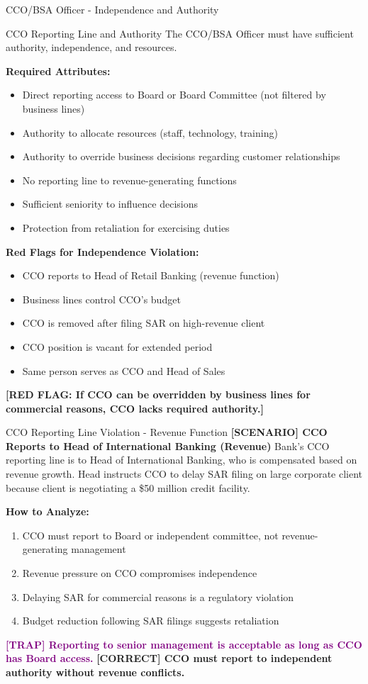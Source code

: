 \documentclass[11pt,a4paper]{beamer}
\newcommand{\trap}[1]{\textcolor{purple}{\textbf{[TRAP] #1}}}
\newcommand{\correct}[1]{\textcolor{green!50!black}{\textbf{[CORRECT] #1}}}
\newcommand{\scenario}[1]{\textcolor{blue!70!black}{\textbf{[SCENARIO] #1}}}
\newcommand{\redflag}[1]{\textcolor{red!80!black}{\textbf{[RED FLAG: #1]}}}
\begin{document}
	\begin{frame}{CCO/BSA Officer - Independence and Authority}
		\begin{block}{CCO Reporting Line and Authority}
			The CCO/BSA Officer must have sufficient authority, independence, and resources.
		\end{block}
		\textbf{Required Attributes:}
		\begin{itemize}
			\item Direct reporting access to Board or Board Committee (not filtered by business lines)
			\item Authority to allocate resources (staff, technology, training)
			\item Authority to override business decisions regarding customer relationships
			\item No reporting line to revenue-generating functions
			\item Sufficient seniority to influence decisions
			\item Protection from retaliation for exercising duties
		\end{itemize}
		\textbf{Red Flags for Independence Violation:}
		\begin{itemize}
			\item CCO reports to Head of Retail Banking (revenue function)
			\item Business lines control CCO's budget
			\item CCO is removed after filing SAR on high-revenue client
			\item CCO position is vacant for extended period
			\item Same person serves as CCO and Head of Sales
		\end{itemize}
		\redflag{If CCO can be overridden by business lines for commercial reasons, CCO lacks required authority.}
	\end{frame}
	
	\begin{frame}{CCO Reporting Line Violation - Revenue Function}
		\scenario{CCO Reports to Head of International Banking (Revenue)}
		Bank's CCO reporting line is to Head of International Banking, who is compensated based on revenue growth. Head instructs CCO to delay SAR filing on large corporate client because client is negotiating a \$50 million credit facility.
		
		\vspace{0.1cm}
		\textbf{How to Analyze:}
		\begin{enumerate}
			\item CCO must report to Board or independent committee, not revenue-generating management
			\item Revenue pressure on CCO compromises independence
			\item Delaying SAR for commercial reasons is a regulatory violation
			\item Budget reduction following SAR filings suggests retaliation
		\end{enumerate}
		\trap{Reporting to senior management is acceptable as long as CCO has Board access.}
		\correct{CCO must report to independent authority without revenue conflicts.}
	\end{frame}
	
\end{document}
